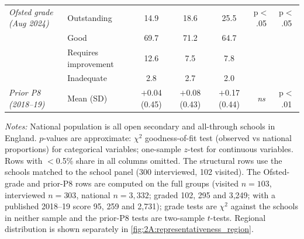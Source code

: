 \begin{table}[htbp]
\begin{tabular}{ll ccc cc}
\addlinespace[3pt]
  \textit{Ofsted grade (Aug 2024)} & Outstanding & 14.9 & 18.6 & 25.5 & p$<$.05 & p$<$.05 \\
   & Good & 69.7 & 71.2 & 64.7 &  &  \\
   & Requires improvement & 12.6 & 7.5 & 7.8 &  &  \\
   & Inadequate & 2.8 & 2.7 & 2.0 &  &  \\
\addlinespace[3pt]
  \textit{Prior P8 (2018--19)} & Mean (SD) & $+$0.04 (0.45) & $+$0.08 (0.43) & $+$0.17 (0.44) & \textit{ns} & p$<$.01 \\
\bottomrule
\end{tabular}
\begin{minipage}{\linewidth}
\smallskip
\footnotesize\textit{Notes:} National population is all open secondary and all-through schools in England.
$p$-values are approximate: $\chi^2$ goodness-of-fit test (observed vs national proportions) for categorical
variables; one-sample $z$-test for continuous variables. Rows with $<$0.5\% share in all columns omitted.
The structural rows use the schools matched to the school panel (300 interviewed, 102 visited).
The Ofsted-grade and prior-P8 rows are computed on the full groups (visited $n=103${,} interviewed $n=303${,} national $n=3{,}332$; graded 102{,} 295 and 3{,}249; with a published 2018--19 score 95{,} 259 and 2{,}731); grade tests are $\chi^2$ against the schools in neither sample and the prior-P8 tests are two-sample $t$-tests.
Regional distribution is shown separately in \cref{fig:2A:representativeness_region}.
\end{minipage}
\end{table}